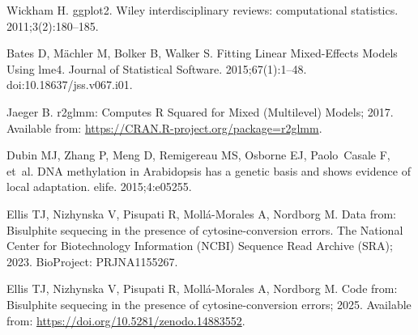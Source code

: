 \documentclass[10pt,draft,letterpaper]{article}
\begin{document}
\begin{thebibliography}{10}
Wickham H.
\newblock ggplot2.
\newblock Wiley interdisciplinary reviews: computational statistics. 2011;3(2):180--185.

Bates D, M{\"a}chler M, Bolker B, Walker S.
\newblock Fitting Linear Mixed-Effects Models Using {lme4}.
\newblock Journal of Statistical Software. 2015;67(1):1--48.
\newblock doi:{10.18637/jss.v067.i01}.

Jaeger B. r2glmm: Computes R Squared for Mixed (Multilevel) Models; 2017.
\newblock Available from: \url{https://CRAN.R-project.org/package=r2glmm}.

Dubin MJ, Zhang P, Meng D, Remigereau MS, Osborne EJ, Paolo~Casale F, et~al.
\newblock DNA methylation in Arabidopsis has a genetic basis and shows evidence of local adaptation.
\newblock elife. 2015;4:e05255.

Ellis TJ, Nizhynska V, Pisupati R, Moll\'a-Morales A, Nordborg M.
\newblock Data from: Bisulphite sequecing in the presence of cytosine-conversion errors.
\newblock The National Center for Biotechnology Information (NCBI) Sequence Read Archive (SRA); 2023. BioProject: PRJNA1155267.

Ellis TJ, Nizhynska V, Pisupati R, Moll\'a-Morales A, Nordborg M. Code from: Bisulphite sequecing in the presence of cytosine-conversion errors; 2025.
\newblock Available from: \url{https://doi.org/10.5281/zenodo.14883552}.

\end{thebibliography}
\end{document}

